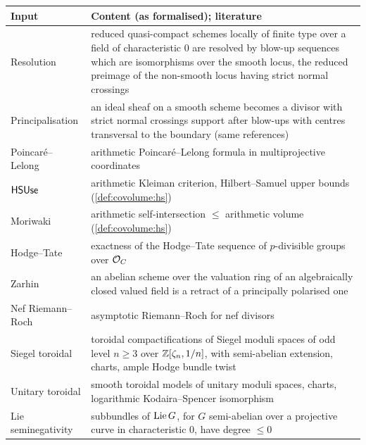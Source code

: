 \begin{table}[htbp]
\centering\footnotesize
\begin{tabular}{@{}>{\raggedright\arraybackslash}p{2.8cm}>{\raggedright\arraybackslash}p{12.2cm}@{}}
\toprule
Input & Content (as formalised); literature\\
\midrule
Resolution & reduced quasi-compact schemes locally of finite type over a field of characteristic $0$
are resolved by blow-up sequences which are isomorphisms over the smooth locus, the reduced preimage of
the non-smooth locus having strict normal crossings \cite{Hironaka1964,BierstoneMilman1997,Wlodarczyk2005,Kollar2007}\\
Principalisation & an ideal sheaf on a smooth scheme becomes a divisor with strict normal crossings
support after blow-ups with centres transversal to the boundary (same references)\\
Poincar\'e--Lelong & arithmetic Poincar\'e--Lelong formula in multiprojective coordinates
\cite{GilletSoule1990,BostGilletSoule1994}\\
$\mathsf{HSUse}$ & arithmetic Kleiman criterion, Hilbert--Samuel upper bounds (\cref{def:covolume:hs})
\cite{GilletSoule1992,AbbesBouche1995,Zhang1995}\\
Moriwaki & arithmetic self-intersection $\le$ arithmetic volume (\cref{def:covolume:hs})
\cite{Moriwaki2009,Yuan2008}\\
Hodge--Tate & exactness of the Hodge--Tate sequence of $p$-divisible groups over $\mathcal{O}_C$
\cite{Faltings1988,FarguesGenestierLafforgue2008}\\
Zarhin & an abelian scheme over the valuation ring of an algebraically closed valued field is a
retract of a principally polarised one \cite{Zarhin1975,Zarhin1985}\\
Nef Riemann--Roch & asymptotic Riemann--Roch for nef divisors \cite{Lazarsfeld2004}\\
Siegel toroidal & toroidal compactifications of Siegel moduli spaces of odd level $n\ge3$ over
$\mathbb{Z}[\zeta_n,1/n]$, with semi-abelian extension, charts, ample Hodge bundle twist
\cite{FaltingsChai1990,AshMumfordRapoportTai1975}\\
Unitary toroidal & smooth toroidal models of unitary moduli spaces, charts, logarithmic
Kodaira--Spencer isomorphism \cite{Lan2013,FaltingsChai1990}\\
Lie seminegativity & subbundles of $\operatorname{Lie} G$, for $G$ semi-abelian over a projective curve in
characteristic $0$, have degree $\le0$ \cite{FaltingsChai1990,MoretBailly1985}\\

\end{tabular}
\end{table}

